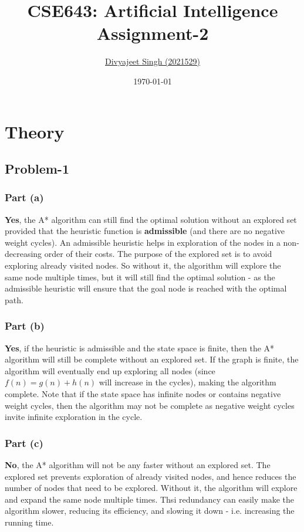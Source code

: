 \documentclass[12pt]{article}
\title{
    \textbf{CSE643: Artificial Intelligence} \\ \vspace*{-5pt}
    \textbf{\large{Assignment-2}}
}
\author{\href{mailto:divyajeet21529@iiitd.ac.in}{Divyajeet Singh (2021529)}}
\date{\today}
\begin{document}
    \maketitle

    \section*{Theory}

    \subsection*{Problem-1}
    \subsubsection*{Part (a)}
    \textbf{Yes}, the A* algorithm can still find the optimal solution without an explored set
    provided that the heuristic function is \textbf{admissible} (and there are no negative weight
    cycles). An admissible heuristic helps in exploration of the nodes in a non-decreasing order
    of their costs. The purpose of the explored set is to avoid exploring already visited nodes.
    So without it, the algorithm will explore the same node multiple times, but it will still
    find the optimal solution - as the admissible heuristic will ensure that the goal node is
    reached with the optimal path.

    \subsubsection*{Part (b)}
    \textbf{Yes}, if the heuristic is admissible and the state space is finite, then the A* algorithm
    will still be complete without an explored set. If the graph is finite, the algorithm will
    eventually end up exploring all nodes (since $f(n) = g(n) + h(n)$ will increase in the
    cycles), making the algorithm complete. Note that if the state space has infinite nodes or
    contains negative weight cycles, then the algorithm may not be complete as negative weight cycles
    invite infinite exploration in the cycle.

    \subsubsection*{Part (c)}
    \textbf{No}, the A* algorithm will not be any faster without an explored set. The explored set
    prevents exploration of already visited nodes, and hence reduces the number of nodes that need
    to be explored. Without it, the algorithm will explore and expand the same node multiple times.
    Thsi redundancy can easily make the algorithm slower, reducing its efficiency, and slowing it down
    - i.e. increasing the running time.
\end{document}
